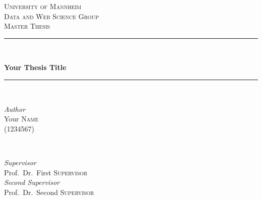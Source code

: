 \hypersetup{pageanchor=false}
\begin{titlepage} %
	\newcommand{\HRule}{\rule{\linewidth}{0.5mm}} %
	
	\center %
	
	
	\textsc{\LARGE University of Mannheim}\\[1.5cm] %
	
	\textsc{\Large Data and Web Science Group}\\[0.5cm] %
	
	\textsc{\large Master Thesis}\\[0.5cm] %
	
	
	\HRule\\[0.4cm]
	
	\begin{doublespace}
		{\huge\bfseries Your Thesis Title}\\[0.1cm] %
	\end{doublespace}
	
	\HRule\\[1.5cm]
	
	
	\begin{minipage}{0.4\textwidth}
		\begin{flushleft}
			\large
			\textit{Author}\\
			Your \textsc{Name}\\ %
			(1234567)\\
			\hfill
		\end{flushleft}
	\end{minipage}
	~
	\begin{minipage}{0.4\textwidth}
		\begin{flushright}
			\large
			\textit{Supervisor}\\
			Prof.\ Dr.\ First \textsc{Supervisor}\\ %
			\textit{Second Supervisor}\\
			Prof.\ Dr.\ Second \textsc{Supervisor}
		\end{flushright}
	\end{minipage}
	

\end{titlepage}
